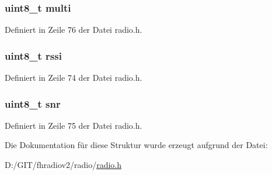 \subsubsection[{multi}]{\setlength{\rightskip}{0pt plus 5cm}uint8\+\_\+t multi}\label{structradio__rsq_af829dbd700d1c5ad1abccbdb52fa7ba9}


Definiert in Zeile 76 der Datei radio.\+h.

\hypertarget{structradio__rsq_afb67d818cd76cce8057affabcb1979a6}{}
\subsubsection[{rssi}]{\setlength{\rightskip}{0pt plus 5cm}uint8\+\_\+t rssi}\label{structradio__rsq_afb67d818cd76cce8057affabcb1979a6}


Definiert in Zeile 74 der Datei radio.\+h.

\hypertarget{structradio__rsq_a11be3c6f2d5194542e5d1733cbc7ac76}{}
\subsubsection[{snr}]{\setlength{\rightskip}{0pt plus 5cm}uint8\+\_\+t snr}\label{structradio__rsq_a11be3c6f2d5194542e5d1733cbc7ac76}


Definiert in Zeile 75 der Datei radio.\+h.



Die Dokumentation für diese Struktur wurde erzeugt aufgrund der Datei\+:\begin{DoxyCompactItemize}
\item 
D\+:/\+G\+I\+T/fhradiov2/radio/\hyperlink{radio_8h}{radio.\+h}\end{DoxyCompactItemize}
